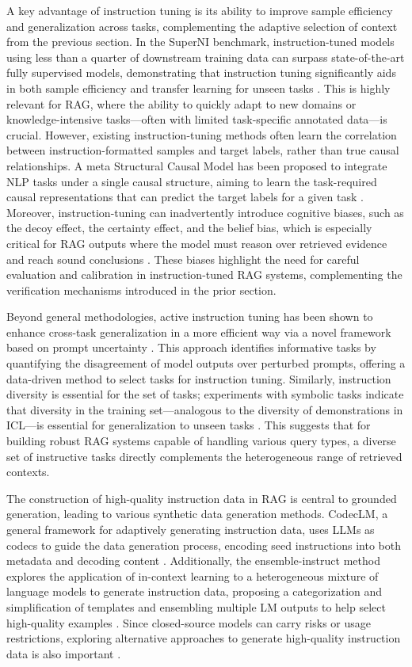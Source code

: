 \documentclass[11pt]{article}
\begin{document}
A key advantage of instruction tuning is its ability to improve sample efficiency and generalization across tasks, complementing the adaptive selection of context from the previous section. In the SuperNI benchmark, instruction-tuned models using less than a quarter of downstream training data can surpass state-of-the-art fully supervised models, demonstrating that instruction tuning significantly aids in both sample efficiency and transfer learning for unseen tasks \cite{ref141}. This is highly relevant for RAG, where the ability to quickly adapt to new domains or knowledge-intensive tasks---often with limited task-specific annotated data---is crucial. However, existing instruction-tuning methods often learn the correlation between instruction-formatted samples and target labels, rather than true causal relationships. A meta Structural Causal Model has been proposed to integrate NLP tasks under a single causal structure, aiming to learn the task-required causal representations that can predict the target labels for a given task \cite{ref142}. Moreover, instruction-tuning can inadvertently introduce cognitive biases, such as the decoy effect, the certainty effect, and the belief bias, which is especially critical for RAG outputs where the model must reason over retrieved evidence and reach sound conclusions \cite{ref143}. These biases highlight the need for careful evaluation and calibration in instruction-tuned RAG systems, complementing the verification mechanisms introduced in the prior section.

Beyond general methodologies, active instruction tuning has been shown to enhance cross-task generalization in a more efficient way via a novel framework based on prompt uncertainty \cite{ref144}. This approach identifies informative tasks by quantifying the disagreement of model outputs over perturbed prompts, offering a data-driven method to select tasks for instruction tuning. Similarly, instruction diversity is essential for the set of tasks; experiments with symbolic tasks indicate that diversity in the training set---analogous to the diversity of demonstrations in ICL---is essential for generalization to unseen tasks \cite{ref145}. This suggests that for building robust RAG systems capable of handling various query types, a diverse set of instructive tasks directly complements the heterogeneous range of retrieved contexts.

The construction of high-quality instruction data in RAG is central to grounded generation, leading to various synthetic data generation methods. CodecLM, a general framework for adaptively generating instruction data, uses LLMs as codecs to guide the data generation process, encoding seed instructions into both metadata and decoding content \cite{ref146}. Additionally, the ensemble-instruct method explores the application of in-context learning to a heterogeneous mixture of language models to generate instruction data, proposing a categorization and simplification of templates and ensembling multiple LM outputs to help select high-quality examples \cite{ref147}. Since closed-source models can carry risks or usage restrictions, exploring alternative approaches to generate high-quality instruction data is also important \cite{ref148}.
\end{document}
